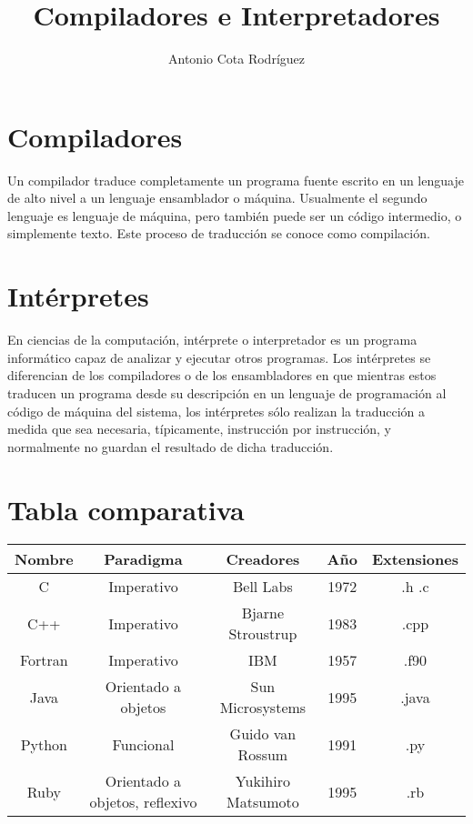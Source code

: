 \documentclass{article}
\title{Compiladores e Interpretadores}
\author{Antonio Cota Rodr\'iguez}
\date{}
\begin{document}
\maketitle

\section{Compiladores}
Un compilador traduce completamente un programa fuente escrito en un lenguaje de alto nivel a un lenguaje ensamblador o m\'aquina. Usualmente el segundo lenguaje es lenguaje de m\'aquina, pero tambi\'en puede ser un c\'odigo intermedio, o simplemente texto. Este proceso de traducci\'on se conoce como compilaci\'on.

\section{Int\'erpretes}
En ciencias de la computaci\'on, int\'erprete o interpretador es un programa inform\'atico capaz de analizar y ejecutar otros programas. Los int\'erpretes se diferencian de los compiladores o de los ensambladores en que mientras estos traducen un programa desde su descripci\'on en un lenguaje de programaci\'on al c\'odigo de m\'aquina del sistema, los int\'erpretes sólo realizan la traducci\'on a medida que sea necesaria, t\'ipicamente, instrucci\'on por instrucci\'on, y normalmente no guardan el resultado de dicha traducci\'on.

\section{Tabla comparativa}
\begin{tabular}{|c | c | c | c | c|}

\hline
Nombre & Paradigma & Creadores & A\~no & Extensiones\\ \hline \hline

C & Imperativo & Bell Labs & 1972 & .h .c \\ \hline

C++ & Imperativo & Bjarne Stroustrup  & 1983 & .cpp \\ \hline

Fortran & Imperativo & IBM & 1957 & .f90\\ \hline

Java & Orientado a objetos & Sun Microsystems & 1995 & .java\\ \hline

Python & Funcional & Guido van Rossum & 1991 & .py\\ \hline

Ruby & Orientado a objetos, reflexivo & Yukihiro Matsumoto & 1995 & .rb \\ \hline

\end{tabular}
\end{document}
